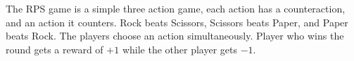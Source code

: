 The RPS game is a simple three action game, each action has a counteraction, and an action it counters.
Rock beats Scissors, Scissors beats Paper, and Paper beats Rock. The players choose an action
simultaneously. Player who wins the round gets a reward of $+1$ while the other player gets $-1$.



